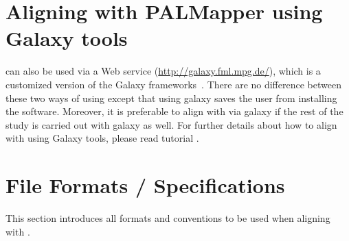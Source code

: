 \documentclass{article}
\begin{document}
\section{Aligning with PALMapper using Galaxy tools}
\label{sec:aligninggal}
\PALMapper{} can also be used via a Web service
(\url{http://galaxy.fml.mpg.de/}), which is a customized version of
the Galaxy frameworks~\cite{Galaxy1,Galaxy2,Galaxy3}. There are no
difference between these two ways of using \PALMapper{} except that using
galaxy saves the user from installing the software. Moreover, it is
preferable to align with \PALMapper{} via galaxy if the rest of the study is
carried out with galaxy as well. For further details about how to
align with \PALMapper{} using Galaxy tools, please read \PALMapper{}
tutorial \cite{Palmapper}.




\section{File Formats / Specifications}
\label{sec:formats}
This section introduces all formats and conventions to be used when
aligning with \PALMapper{}.
\end{document}
